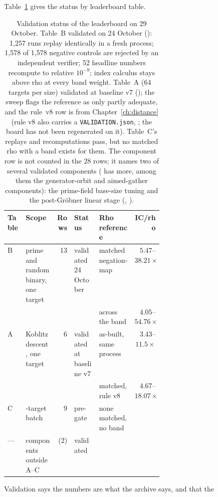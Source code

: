 Table~\ref{tab:audit-validation} gives the status by leaderboard table.

\begin{table}[t]
\centering\small
\begin{tabular}{@{}l>{\raggedright\arraybackslash}p{0.2\linewidth}r>{\raggedright\arraybackslash}p{0.16\linewidth}lr@{}}
\toprule
Table & Scope & Rows & Status & Rho reference & IC/rho \\
\midrule
B & prime and random binary, one target & 13 & validated 24 October & matched negation-map & $5.47$--$38.21\times$ \\
 & & & & across the band & $4.05$--$54.76\times$ \\
\addlinespace
A & Koblitz descent, one target & 6 & validated at baseline v7 & as-built, same process & $3.43$--$11.5\times$ \\
 & & & & matched, rule v8 & $4.67$--$18.07\times$ \\
\addlinespace
C & 32-target batch & 9 & pre-gate & none matched, no band & \\
\addlinespace
--- & components outside A--C & (2) & validated & & \\
\bottomrule
\end{tabular}
\caption[]{Validation status of the leaderboard on 29 October. Table~B
validated on 24 October ():
1{,}257 runs replay identically in a fresh process; 1{,}578 of 1{,}578
negative controls are rejected by an independent verifier; 52 headline
numbers recompute to relative $10^{-9}$; index calculus stays above rho at
every band weight. Table~A (64 targets per size) validated at baseline v7
(); the sweep flags the reference as
only partly adequate, and the rule~v8 row is from
Chapter~\ref{ch:distance} (rule v8 also carries a \texttt{VALIDATION.json},
; the board has not
been regenerated on it). Table~C's replays and recomputations pass, but
no matched rho with a band exists for them. The component row is not
counted in the 28 rows; it names two of several validated components
( has more, among them the generator-orbit
and aimed-gather components): the prime-field base-size tuning and the post-Gröbner linear stage
(,
).}
\label{tab:audit-validation}
\end{table}
Validation says the numbers are what the archive says, and that the
